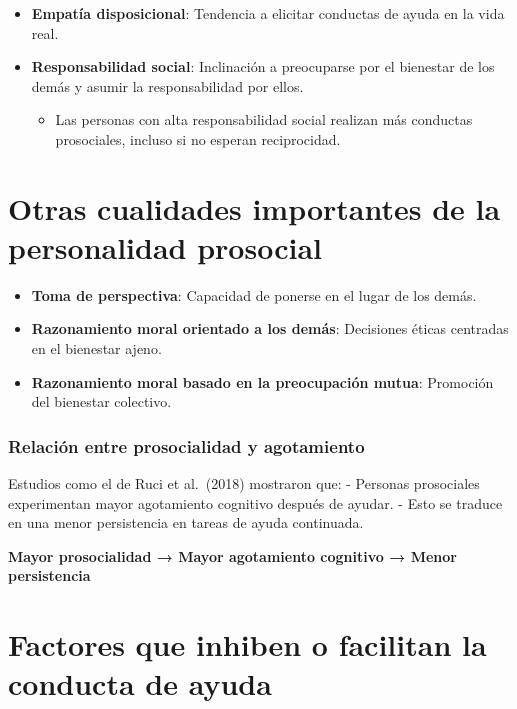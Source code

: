 \documentclass[
]{book}
\providecommand{\tightlist}{%
  \setlength{\itemsep}{0pt}\setlength{\parskip}{0pt}}
\begin{document}
\begin{itemize}
\tightlist
\item
  \textbf{Empatía disposicional}: Tendencia a elicitar conductas de ayuda en la vida real.
\item
  \textbf{Responsabilidad social}: Inclinación a preocuparse por el bienestar de los demás y asumir la responsabilidad por ellos.

  \begin{itemize}
  \tightlist
  \item
    Las personas con alta responsabilidad social realizan más conductas prosociales, incluso si no esperan reciprocidad.
  \end{itemize}
\end{itemize}

\section{Otras cualidades importantes de la personalidad prosocial}\label{otras-cualidades-importantes-de-la-personalidad-prosocial}

\begin{itemize}
\tightlist
\item
  \textbf{Toma de perspectiva}: Capacidad de ponerse en el lugar de los demás.
\item
  \textbf{Razonamiento moral orientado a los demás}: Decisiones éticas centradas en el bienestar ajeno.
\item
  \textbf{Razonamiento moral basado en la preocupación mutua}: Promoción del bienestar colectivo.
\end{itemize}

\subsubsection{Relación entre prosocialidad y agotamiento}\label{relaciuxf3n-entre-prosocialidad-y-agotamiento}

Estudios como el de Ruci et al.~(2018) mostraron que:
- Personas prosociales experimentan mayor agotamiento cognitivo después de ayudar.
- Esto se traduce en una menor persistencia en tareas de ayuda continuada.

\textbf{Mayor prosocialidad → Mayor agotamiento cognitivo → Menor persistencia}

\section{Factores que inhiben o facilitan la conducta de ayuda}\label{factores-que-inhiben-o-facilitan-la-conducta-de-ayuda}
\end{document}
